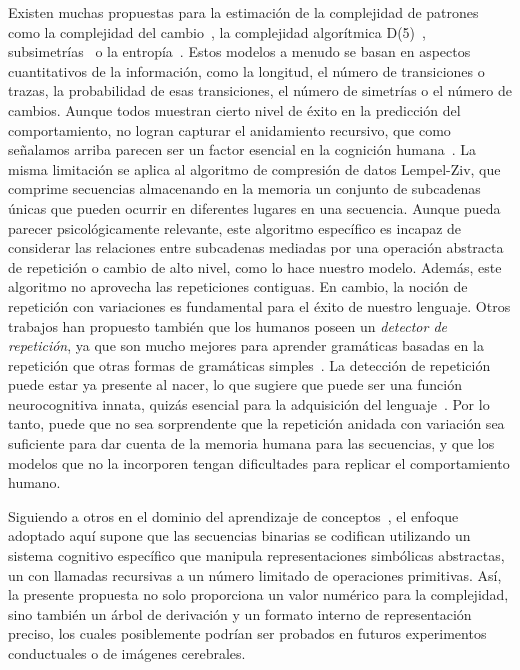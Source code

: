 Existen muchas propuestas para la estimación de la complejidad de patrones como la complejidad del cambio~\cite{f47}, la complejidad algorítmica D(5)~\cite{f44,f45,f46}, subsimetrías~\cite{f94} o la entropía~\cite{f34,f96,f97,f98,f111}. Estos modelos a menudo se basan en aspectos cuantitativos de la información, como la longitud, el número de transiciones o trazas, la probabilidad de esas transiciones, el número de simetrías o el número de cambios. Aunque todos muestran cierto nivel de éxito en la predicción del comportamiento, no logran capturar el anidamiento recursivo, que como señalamos arriba parecen ser un factor esencial en la cognición humana~\cite{f4,f6}. La misma limitación se aplica al algoritmo de compresión de datos Lempel-Ziv, que comprime secuencias almacenando en la memoria un conjunto de subcadenas únicas que pueden ocurrir en diferentes lugares en una secuencia. Aunque pueda parecer psicológicamente relevante, este algoritmo específico es incapaz de considerar las relaciones entre subcadenas mediadas por una operación abstracta de repetición o cambio de alto nivel, como lo hace nuestro modelo. Además, este algoritmo no aprovecha las repeticiones contiguas. En cambio, la noción de repetición con variaciones es fundamental para el éxito de nuestro lenguaje. Otros trabajos han propuesto también que los humanos poseen un \textit{detector de repetición}, ya que son mucho mejores para aprender gramáticas basadas en la repetición que otras formas de gramáticas simples~\cite{f113}. La detección de repetición puede estar ya presente al nacer, lo que sugiere que puede ser una función neurocognitiva innata, quizás esencial para la adquisición del lenguaje~\cite{f114}. Por lo tanto, puede que no sea sorprendente que la repetición anidada con variación sea suficiente para dar cuenta de la memoria humana para las secuencias, y que los modelos que no la incorporen tengan dificultades para replicar el comportamiento humano.


Siguiendo a otros en el dominio del aprendizaje de conceptos~\cite{piantadosi2012bootstrapping,piantadosi2016logical}, el enfoque adoptado aquí supone que las secuencias binarias se codifican utilizando un sistema cognitivo específico que manipula representaciones simbólicas abstractas, un \lot con llamadas recursivas a un número limitado de operaciones primitivas. Así, la presente propuesta no solo proporciona un valor numérico para la complejidad, sino también un árbol de derivación y un formato interno de representación preciso, los cuales posiblemente podrían ser probados en futuros experimentos conductuales o de imágenes cerebrales.

